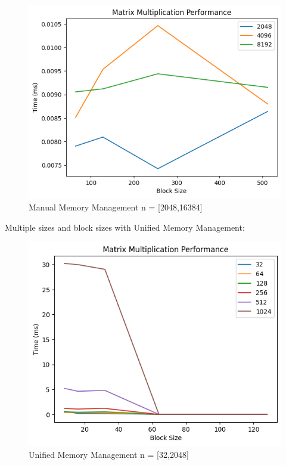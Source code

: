 \documentclass[12p,english]{article}
\begin{document}
\begin{figure}[H]
\centering
\includegraphics[scale= 0.6]{ManualL.png}
\caption{Manual Memory Management n = [2048,16384]}
\end{figure}

Multiple sizes and block sizes with Unified Memory Management:
\begin{figure}[H]
\centering
\includegraphics[scale= 0.6]{UnifiedS.png}
\caption{Unified Memory Management n = [32,2048]}
\end{figure}
\end{document}
